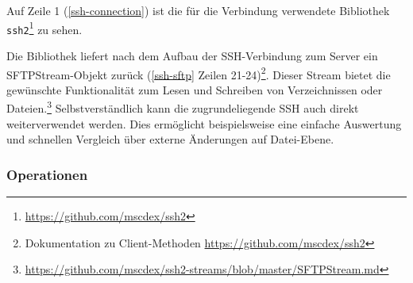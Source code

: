 Auf Zeile 1 (\autoref{ssh-connection}) ist die für die Verbindung verwendete Bibliothek \texttt{ssh2}\footnote{\url{https://github.com/mscdex/ssh2}} zu sehen.





Die Bibliothek liefert nach dem Aufbau der \gls{SSH}-Verbindung zum Server ein \gls{SFTP}\gls{Stream}-Objekt zurück (\autoref{ssh-sftp} Zeilen 21-24)\footnote{Dokumentation zu Client-Methoden \url{https://github.com/mscdex/ssh2}}. Dieser \gls{Stream} bietet die gewünschte Funktionalität zum Lesen und Schreiben von Verzeichnissen oder Dateien.\footnote{\url{https://github.com/mscdex/ssh2-streams/blob/master/SFTPStream.md}} Selbstverständlich kann die zugrundeliegende \gls{SSH} auch direkt weiterverwendet werden. Dies ermöglicht beispielsweise eine einfache Auswertung und schnellen Vergleich über externe Änderungen auf Datei-Ebene.



\subsubsection{Operationen}


